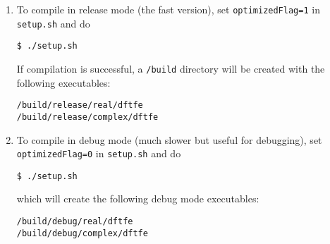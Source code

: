 \begin{enumerate}
\item To compile \dftfe{} in release mode (the fast version), set \verb|optimizedFlag=1| in \verb|setup.sh| and do
\begin{verbatim}
$ ./setup.sh
\end{verbatim} 
If compilation is successful, a \verb|/build| directory will be created with the following executables:
\begin{verbatim}
/build/release/real/dftfe
/build/release/complex/dftfe
\end{verbatim}

\item
To compile \dftfe{} in debug mode (much slower but useful for debugging), set \verb|optimizedFlag=0| in \verb|setup.sh| and do
\begin{verbatim}
$ ./setup.sh
\end{verbatim}
which will create the following debug mode executables:
\begin{verbatim}
/build/debug/real/dftfe
/build/debug/complex/dftfe
\end{verbatim}
\end{enumerate}
